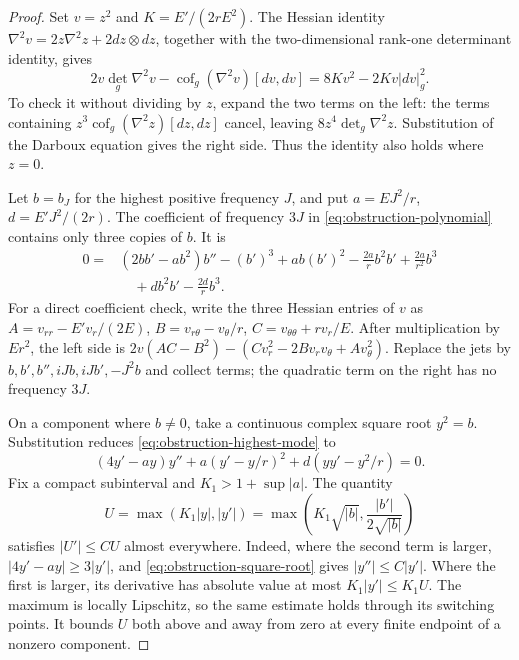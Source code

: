\begin{proof}
Set $v=z^2$ and $K=E'/(2rE^2)$. The Hessian identity
$\nabla^2v=2z\nabla^2z+2dz\otimes dz$, together with the
two-dimensional rank-one determinant identity, gives
\begin{equation}\label{eq:obstruction-polynomial}
 2v\det_g\nabla^2v-\operatorname{cof}_g(\nabla^2v)[dv,dv]
       =8Kv^2-2Kv|dv|_g^2.
\end{equation}
To check it without dividing by $z$, expand the two terms on the
left: the terms containing
$z^3\operatorname{cof}_g(\nabla^2z)[dz,dz]$ cancel, leaving
$8z^4\det_g\nabla^2z$. Substitution of the Darboux equation
gives the right side. Thus the identity also holds where $z=0$.

Let $b=b_J$ for the highest positive frequency $J$, and put
$a=EJ^2/r$, $d=E'J^2/(2r)$. The coefficient of frequency $3J$
in \eqref{eq:obstruction-polynomial} contains only three copies
of $b$. It is
\begin{equation}\label{eq:obstruction-highest-mode}
\begin{split}
0={}&(2bb'-ab^2)b''-(b')^3+ab(b')^2
 -\frac{2a}{r}b^2b'+\frac{2a}{r^2}b^3\\
 &\quad+db^2b'-\frac{2d}{r}b^3.
\end{split}
\end{equation}
For a direct coefficient check, write the three Hessian entries of
$v$ as
$A=v_{rr}-E'v_r/(2E)$,
$B=v_{r\theta}-v_\theta/r$,
$C=v_{\theta\theta}+rv_r/E$.
After multiplication by $Er^2$, the left side is
$2v(AC-B^2)-(Cv_r^2-2Bv_rv_\theta+Av_\theta^2)$.
Replace the jets by $b,b',b'',iJb,iJb',-J^2b$ and collect
terms; the quadratic term on the right has no frequency $3J$.

On a component where $b\ne0$, take a continuous complex square root
$y^2=b$. Substitution reduces \eqref{eq:obstruction-highest-mode} to
\begin{equation}\label{eq:obstruction-square-root}
 (4y'-ay)y''+a(y'-y/r)^2+d(yy'-y^2/r)=0.
\end{equation}
Fix a compact subinterval and $K_1>1+\sup|a|$. The quantity
\[
 U=\max(K_1|y|,|y'|)
   =\max\left(K_1\sqrt{|b|},
                    \frac{|b'|}{2\sqrt{|b|}}\right)
\]
satisfies $|U'|\le CU$ almost everywhere. Indeed, where the second
term is larger, $|4y'-ay|\ge3|y'|$, and
\eqref{eq:obstruction-square-root} gives $|y''|\le C|y'|$.
Where the first is larger, its derivative has absolute value at
most $K_1|y'|\le K_1U$. The maximum is locally Lipschitz,
so the same estimate holds through its switching points.
It bounds $U$ both above and away from zero at every finite
endpoint of a nonzero component.


\end{proof}
